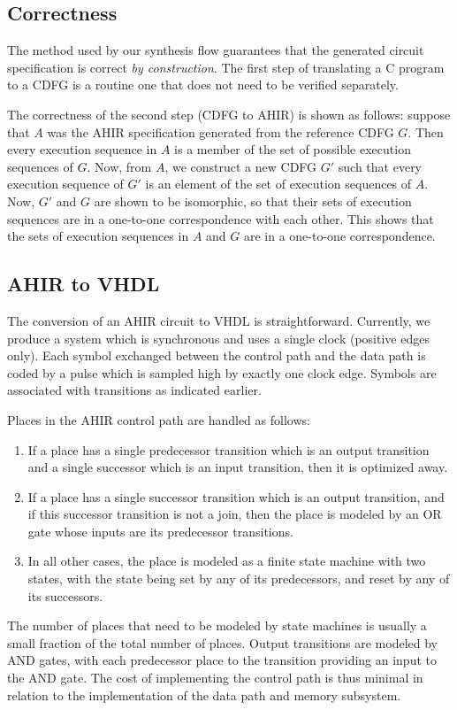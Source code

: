 \documentclass[conference]{IEEEtran}
\begin{document}
\subsection{Correctness}

The method used by our synthesis flow guarantees that the generated
circuit specification is correct {\em by construction}. The first step
of translating a C program to a CDFG is a routine one that does not
need to be verified separately. 

The correctness of the second step (CDFG to AHIR) is shown
as follows\cite{ahir_thesis}: suppose that
$A$ was the AHIR specification generated from the
reference CDFG $G$.  Then every execution sequence
in $A$ is a member of the set of
possible execution sequences of $G$.  Now,
from $A$, we construct a new CDFG $G'$ such
that every execution sequence of  $G'$  is
an element of the set of execution sequences
of $A$.  Now, $G'$ and $G$ are shown to be isomorphic,
so that their sets of execution sequences are in 
a one-to-one correspondence with each other.  This
shows that the sets of execution sequences in $A$ and
$G$ are in a one-to-one correspondence.

\subsection{AHIR to VHDL}

The conversion of an AHIR circuit to VHDL is straightforward.
Currently, we produce a system which is synchronous and uses a single
clock (positive edges only). Each symbol exchanged between the control
path and the data path is coded by a pulse which is sampled high by
exactly one clock edge. Symbols are associated with transitions as
indicated earlier.

Places in the AHIR control path are handled as follows:
\begin{enumerate}
\item If a place has a single predecessor transition which is
an output transition and a single successor which is an input
transition, then it is optimized away.
\item If a place has a single successor transition which is
an output transition, and if this successor transition is
not a join, then the place is modeled by an OR gate whose inputs
are its predecessor transitions.
\item In all other cases, the place is modeled as a finite state
  machine with two states, with the state being set by any of its
  predecessors, and reset by any of its successors.
\end{enumerate}
The number of places that need to be modeled by state machines is
usually a small fraction of the total number of places.
Output transitions are modeled by AND gates, with each predecessor place
to the transition providing an input to the AND gate.  The cost
of implementing the control path is thus minimal in relation to
the implementation of the data path and memory subsystem.
\end{document}
